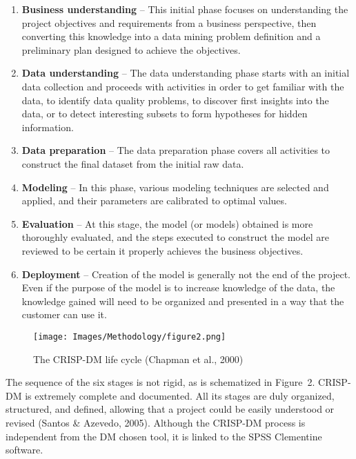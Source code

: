 \begin{enumerate}
    \item \textbf{Business understanding} – This initial phase focuses on understanding the project objectives and requirements from a business perspective, then converting this knowledge into a data mining problem definition and a preliminary plan designed to achieve the objectives.  

    \item \textbf{Data understanding} – The data understanding phase starts with an initial data collection and proceeds with activities in order to get familiar with the data, to identify data quality problems, to discover first insights into the data, or to detect interesting subsets to form hypotheses for hidden information.  

    \item \textbf{Data preparation} – The data preparation phase covers all activities to construct the final dataset from the initial raw data.  

    \item \textbf{Modeling} – In this phase, various modeling techniques are selected and applied, and their parameters are calibrated to optimal values.  

    \item \textbf{Evaluation} – At this stage, the model (or models) obtained is more thoroughly evaluated, and the steps executed to construct the model are reviewed to be certain it properly achieves the business objectives.  

    \item \textbf{Deployment} – Creation of the model is generally not the end of the project. Even if the purpose of the model is to increase knowledge of the data, the knowledge gained will need to be organized and presented in a way that the customer can use it.  
\end{enumerate}

 

\begin{figure}[h]
    \centering
    \texttt{[image: Images/Methodology/figure2.png]}
    \caption{The CRISP-DM life cycle (Chapman et al., 2000)}
\end{figure}

The sequence of the six stages is not rigid, as is schematized in Figure~2. CRISP-DM is extremely complete and documented. All its stages are duly organized, structured, and defined, allowing that a project could be easily understood or revised (Santos \& Azevedo, 2005). Although the CRISP-DM process is independent from the DM chosen tool, it is linked to the SPSS Clementine software.  


